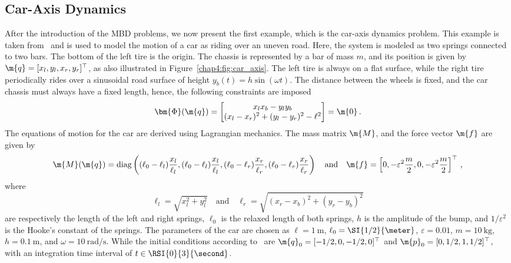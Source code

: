 \subsection{Car-Axis Dynamics}

After the introduction of the \ac{MBD} problems, we now present the first example, which is the car-axis dynamics problem. This example is taken from~\cite{lioen1998test, mazzia2008test} and is used to model the motion of a car as riding over an uneven road. Here, the system is modeled as two springs connected to two bars. The bottom of the left tire is the origin. The chassis is represented by a bar of mass $m$, and its position is given by $\m{q} = [x_l, y_l, x_r, y_r]^\top$, as also illustrated in Figure~\ref{chap4:fig:car_axis}. The left tire is always on a flat surface, while the right tire periodically rides over a sinusoidal road surface of height $y_b(t) = h\sin(\omega t)$. The distance between the wheels is fixed, and the car chassis must always have a fixed length, hence, the following constraints are imposed
%
\begin{equation*}
  \bm{\Phi}(\m{q}) = \begin{bmatrix}
    x_l x_b - y_l y_b \\
    (x_l - x_r)^2 + (y_l - y_r)^2 - \ell^2
  \end{bmatrix} = \m{0} \, \text{.}
\end{equation*}
%
The equations of motion for the car are derived using Lagrangian mechanics. The mass matrix $\m{M}$, and the force vector $\m{f}$ are given by
%
\begin{equation*}
  \m{M}(\m{q}) = \mathrm{diag}\left(
    (\ell_0-\ell_l)\dfrac{x_l}{\ell_l},
    (\ell_0-\ell_l)\dfrac{x_l}{\ell_l},
    (\ell_0-\ell_r)\dfrac{x_r}{\ell_r},
    (\ell_0-\ell_r)\dfrac{x_r}{\ell_r}
  \right)
  \quad \text{and} \quad
  \m{f} = \left[
    0, -\varepsilon^2\dfrac{m}{2},
    0, -\varepsilon^2\dfrac{m}{2}
  \right]^{\top}
  \, \text{,}
\end{equation*}
%
where
%
\begin{equation*}
  \ell_l = \sqrt{x_l^2 + y_l^2}
  \quad \text{and} \quad
  \ell_r = \sqrt{(x_r - x_b)^2 + (y_r - y_b)^2}
\end{equation*}
%
are respectively the length of the left and right springs, $\ell_0$ is the relaxed length of both springs, $h$ is the amplitude of the bump, and $1/\varepsilon^2$ is the Hooke's constant of the springs. The parameters of the car are chosen as $\ell = \SI{1}{\meter}$, $\ell_0 = \SI{1/2}{\meter}$, $\varepsilon = 0.01$, $m = \SI{10}{\kilo\gram}$, $h = \SI{0.1}{\meter}$, and $\omega = \SI{10}{\radian\per\second}$. While the initial conditions according to~\cite{lioen1998test, mazzia2008test} are $\m{q}_0 = [-1/2, 0, -1/2, 0]^\top$ and $\m{p}_0 = [0, 1/2, 1, 1/2]^\top$, with an integration time interval of $t \in \RSI{0}{3}{\second}$.

